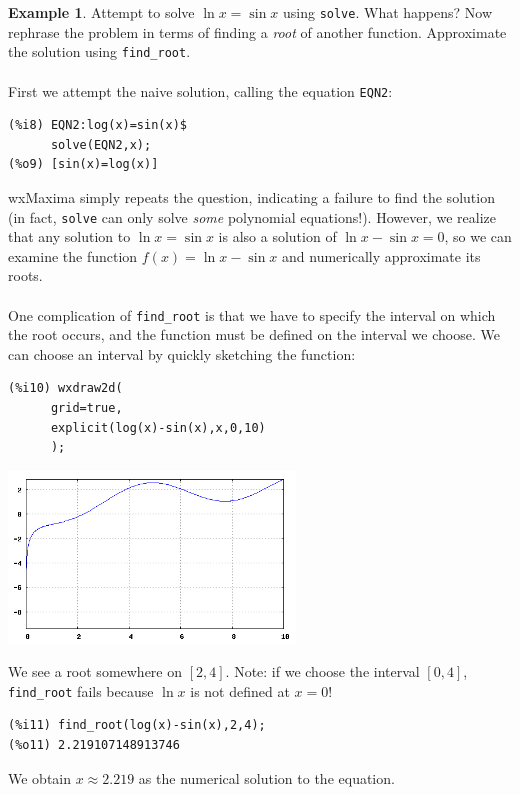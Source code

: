 \documentclass[10.5pt,twoside]{report}
\theoremstyle{definition}
\newtheorem{exmp}{Example}[section]
\begin{document}
\begin{exmp} Attempt to solve $\ln{x}=\sin{x}$ using \verb|solve|.  What happens?  Now rephrase the problem in terms of finding a \textit{root} of another function.  Approximate the solution using \verb|find_root|.\\
${}$\\

First we attempt the naive solution, calling the equation \verb|EQN2|:

\begin{verbatim}
(%i8) EQN2:log(x)=sin(x)$
      solve(EQN2,x);
(%o9) [sin(x)=log(x)]
\end{verbatim}

wxMaxima simply repeats the question, indicating a failure to find the solution (in fact, \verb|solve| can only solve \textit{some} polynomial equations!).  However, we realize that any solution to $\ln{x}=\sin{x}$ is also a solution of $\ln{x}-\sin{x}=0$, so we can examine the function $f(x)=\ln{x}-\sin{x}$ and numerically approximate its roots.\\
${}$\\
One complication of \verb|find_root| is that we have to specify the interval on which the root occurs, and the function must be defined on the interval we choose.  We can choose an interval by quickly sketching the function:


\begin{verbatim}
(%i10) wxdraw2d(
      grid=true,
      explicit(log(x)-sin(x),x,0,10)
      );
\end{verbatim}

\includegraphics[width=3in]{example_0_4_2_1}

We see a root somewhere on $[2,4]$.  Note:  if we choose the interval $[0,4]$, \verb|find_root| fails because $\ln{x}$ is not defined at $x=0$!

\begin{verbatim}
(%i11) find_root(log(x)-sin(x),2,4);
(%o11) 2.219107148913746
\end{verbatim}

We obtain $x \approx 2.219$ as the numerical solution to the equation.

\end{exmp}
\end{document}
